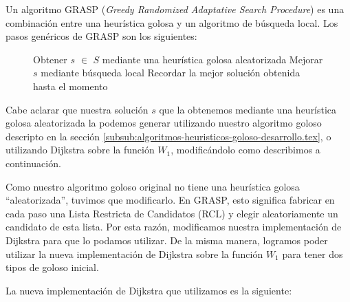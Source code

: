 Un algoritmo GRASP (\emph{Greedy Randomized Adaptative Search Procedure}) es una combinación entre una heurística golosa y un algoritmo de búsqueda local. Los pasos genéricos de GRASP son los siguientes:

\begin{center}
 \begin{figure}[H]
  \begin{pseudo}
    \State Obtener $s$ $\in$ $S$ mediante una heurística golosa aleatorizada
    \State Mejorar $s$ mediante búsqueda local
    \State Recordar la mejor solución obtenida hasta el momento
    \EndWhile
    \EndProcedure
  \end{pseudo}
 \end{figure}
\end{center}

Cabe aclarar que nuestra solución $s$ que la obtenemos mediante una heurística golosa aleatorizada la podemos generar utilizando nuestro algoritmo goloso descripto en la sección \ref{subsub:algoritmos-heuristicos-goloso-desarrollo.tex}, o utilizando Dijkstra sobre la función $W_1$, modificándolo como describimos a continuación.

Como nuestro algoritmo goloso original no tiene una heurística golosa ``aleatorizada'', tuvimos que modificarlo. En GRASP, esto significa fabricar en cada paso una Lista Restricta de Candidatos (RCL) y elegir aleatoriamente un candidato de esta lista. Por esta razón, modificamos nuestra implementación de Dijkstra para que lo podamos utilizar. De la misma manera, logramos poder utilizar la nueva implementación de Dijkstra sobre la función $W_1$ para tener dos tipos de goloso inicial.

La nueva implementación de Dijkstra que utilizamos es la siguiente:

